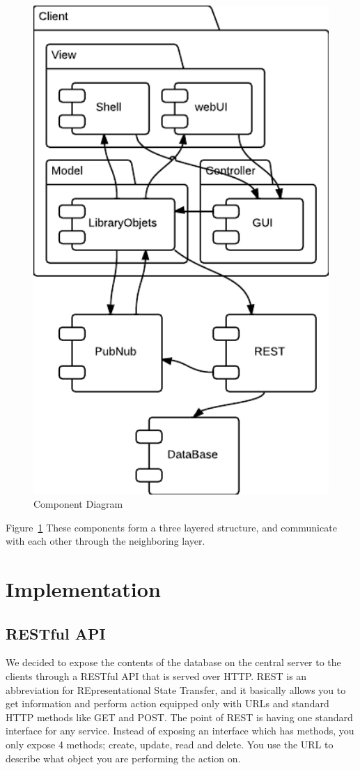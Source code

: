 \begin{figure}[h]
\centering
\includegraphics[width=5in]{image/architecture/s1/s1ComponentDiagram.png}
\caption{Component Diagram}
\label{figure:s1ComponentDiagram}
\end{figure}

Figure~\ref{figure:s1ComponentDiagram} These components form a three layered structure, and communicate with each other through the neighboring layer.


\section{Implementation}

\subsection{RESTful API}
We decided to expose the contents of the database on the central server to the clients through a RESTful API that is served over HTTP. REST is an abbreviation for REpresentational State Transfer, and it basically allows you to get information and perform action equipped only with URLs and standard HTTP methods like GET and POST. The point of REST is having one standard interface for any service. Instead of exposing an interface which has methods, you only expose 4 methods; create, update, read and delete.  You use the URL to describe what object you are performing the action on.

